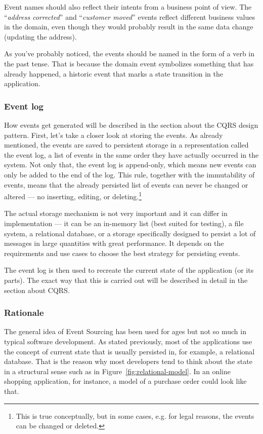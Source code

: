 \documentclass{book}
\begin{document}
Event names should also reflect their intents from a business point of
view. The ``\emph{address corrected}'' and ``\emph{customer moved}''
events reflect different business values in the domain, even though they
would probably result in the same data change (updating the address).

As you've probably noticed, the events should be named in the form of a
verb in the past tense. That is because the domain event symbolizes
something that has already happened, a historic event that marks a state
transition in the application.

\subsubsection{Event log}\label{event-log}

How events get generated will be described in the section about the CQRS
design pattern. First, let's take a closer look at storing the events.
As already mentioned, the events are saved to persistent storage in a
representation called the event log, a list of events in the same order
they have actually occurred in the system. Not only that, the event log
is append-only, which means new events can only be added to the end of
the log. This rule, together with the immutability of events, means that
the already persisted list of events can never be changed or altered ---
no inserting, editing, or
deleting.\footnote{This is true conceptually, but in some cases, e.g. for legal reasons, the events can be changed or deleted.\cite{greg-youtube}}

The actual storage mechanism is not very important and it can differ in
implementation --- it can be an in-memory list (best suited for
testing), a file system, a relational database, or a storage
specifically designed to persist a lot of messages in large quantities
with great performance. It depends on the requirements and use cases to
choose the best strategy for persisting events.

The event log is then used to recreate the current state of the
application (or its parts). The exact way that this is carried out will
be described in detail in the section about CQRS.

\subsubsection{Rationale}\label{rationale}

The general idea of Event Sourcing has been used for ages but not so
much in typical software development. As stated previously, most of the
applications use the concept of current state that is usually persisted
in, for example, a relational database. That is the reason why most
developers tend to think about the state in a structural sense such as
in Figure~\ref{fig:relational-model}. In an online shopping application,
for instance, a model of a purchase order could look like that.
\end{document}
